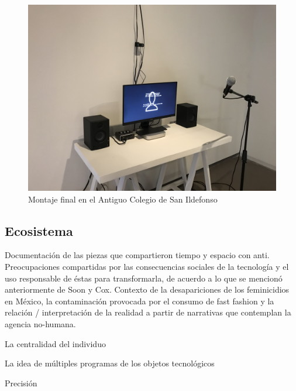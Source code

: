 \begin{figure}[tb]
\centering 
\includegraphics[width=\columnwidth]{../img/ildefonso.jpg} 
\caption[Montaje Anti en San Ildefonso]{Montaje final en el Antiguo Colegio de San Ildefonso} %
\label{fig:gallery} 
\end{figure}


\subsection{Ecosistema}

Documentación de las piezas que compartieron tiempo y espacio con anti. Preocupaciones compartidas por las consecuencias sociales de la tecnología y el uso responsable de éstas para transformarla, de acuerdo a lo que se mencionó anteriormente de Soon y Cox. Contexto de la desapariciones de los feminicidios en México, la contaminación provocada por el consumo de fast fashion y la relación / interpretación de la realidad a partir de narrativas que contemplan la agencia no-humana. 

La centralidad del individuo 

La idea de múltiples programas de los objetos tecnológicos \citep{latour}


Precisión 

